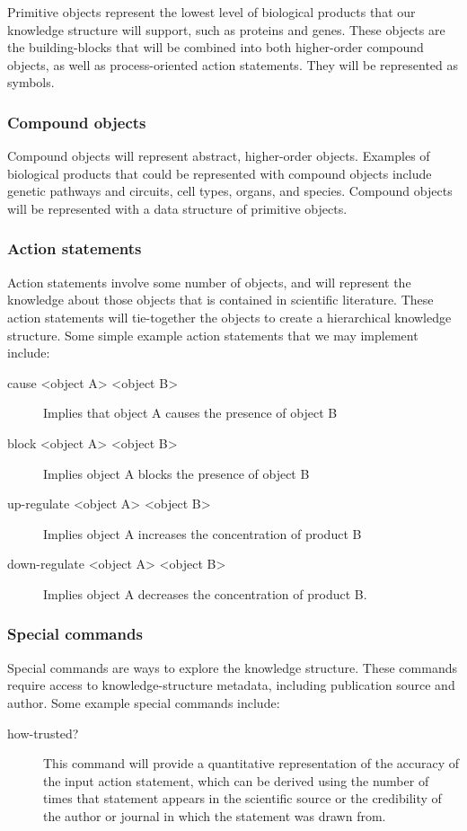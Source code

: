 \documentclass[11pt]{article}
\begin{document}
Primitive objects represent the lowest level of biological products that our knowledge structure will support, such as proteins and genes. These objects are the building-blocks that will be combined into both higher-order compound objects, as well as process-oriented action statements. They will be represented as symbols.

\subsubsection{Compound objects
}
\label{sec-2-2-2}


Compound objects will represent abstract, higher-order objects. Examples of biological products that could be represented with compound objects include genetic pathways and circuits, cell types, organs, and species. Compound objects will be represented with a data structure of primitive objects.

\subsubsection{Action statements
}
\label{sec-2-2-3}


Action statements involve some number of objects, and will represent the knowledge about those objects that is contained in scientific literature. These action statements will tie-together the objects to create a hierarchical knowledge structure. Some simple example action statements that we may implement include:
\begin{description}
\item[{cause <object A> <object B>}] Implies that object A causes the presence of object B
\item[{block <object A> <object B>}] Implies object A blocks the presence of object B
\item[{up-regulate <object A> <object B>}] Implies object A increases the concentration of product B
\item[{down-regulate <object A> <object B>}] Implies object A decreases the concentration of product B.
\end{description}

\subsubsection{Special commands
}
\label{sec-2-2-4}


Special commands are ways to explore the knowledge structure. These commands require access to knowledge-structure metadata, including publication source and author. Some example special commands include:
\begin{description}
\item[{how-trusted?}] This command will provide a quantitative representation of the accuracy of the input action statement, which can be derived using the number of times that statement appears in the scientific source or the credibility of the author or journal in which the statement was drawn from.
\end{description}
\end{document}
